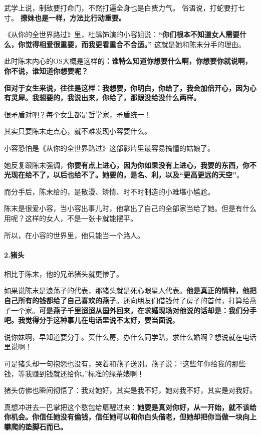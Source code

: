 \documentclass[UTF8,a4paper,8pt]{ctexart}
\begin{document}
 武学上说，制敌要打命门，不然打遍全身也是白费力气。
 俗语说，打蛇要打七寸。
 \textbf{撩妹也是一样，方法比行动重要。}
 
 
 《从你的全世界路过》里，杜鹃饰演的小容姐说：\textbf{“你们根本不知道女人需要什么，你觉得相爱很重要，而我更看重合不合适。”}
 这就是她和陈末分手的理由。
 
 此时陈末内心的OS大概是这样的\textbf{：谁特么知道你想要什么啊，你想要你就说啊，你不说，谁知道你想要呢？}
 
 \textbf{但对于女生来说，往往是这样：我想要，你明白，你给了，我会加倍开心，因为心有灵犀。我想要的，我说出来，你给了，那跟没给没什么两样。}
 
 很矛盾对吧？每个女生都是哲学家，矛盾统一！
 
 其实只要陈末走点心，就不难发现小容要什么。
 
 小容恐怕是《从你的全世界路过》这部影片里最容易搞懂的姑娘了。
 
 她反复跟陈末强调，\textbf{你要有点上进心，因为你如果没有上进心，我要的东西，你不光现在给不了，以后也给不了。她要的，是名、利，以及“更高更远的天空”}。
 
 而分手后，陈末给的，是散漫、矫情、时不时制造的小难堪小尴尬。
 
 陈末是很爱小容，当小容出事儿时，他拿出了自己的全部家当给了她。但是有什么用呢？这样的女人，不是一张卡就能摆平。
 
 所以，在小容的世界里，他只能当一个路人。
 
 \paragraph{2.猪头}
 相比于陈末，他的兄弟猪头就更惨了。
 
 如果说陈末是浪荡子的代表，那猪头就是死心眼星人代表。\textbf{他是真正的情种，他把自己所有的钱都给了自己喜欢的燕子}。还向朋友们借钱付了房子的首付，打算给燕子一个家。\textbf{可是燕子千里迢迢从国外回来，在求婚现场对他说的话却是：我们分手吧。我觉得分手这种事儿在电话里说不太好，要当面说}。
 
 说你妹啊，早知道要分手。买什么房，办什么同学趴，求什么婚啊？想说就在电话里说啊！
 
 可是猪头却一句抱怨也没有，哭着和燕子送别。燕子说：“这些年你给我的那些钱，等我赚到钱就还给你。”标准的绿茶婊啊！
 
 猪头仿佛也瞬间彻悟了：我对她好，其实是我不好，她对我不好，其实是对我好。
 
 真想冲进去一巴掌把这个憨包给扇醒过来：\textbf{她要是真对你好，从一开始，就不该给你机会。你信任她没有偷钱，信任她可以和你白头偕老，但她却把你当做一块向上攀爬的垫脚石而已。}
 
\end{document}
